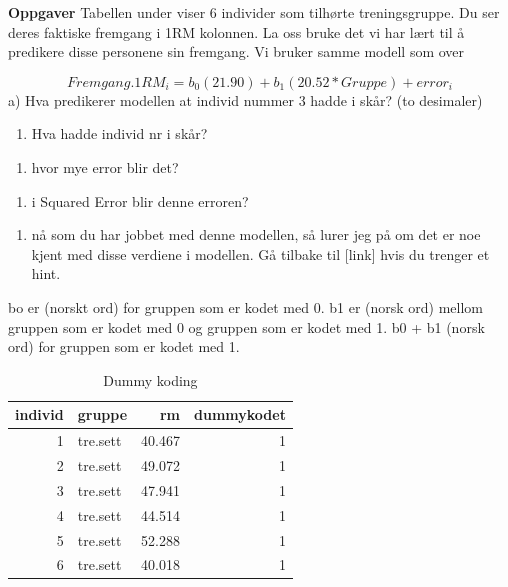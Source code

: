 \documentclass[
]{book}
\providecommand{\tightlist}{%
  \setlength{\itemsep}{0pt}\setlength{\parskip}{0pt}}
\begin{document}
\textbf{Oppgaver}
Tabellen under viser 6 individer som tilhørte treningsgruppe. Du ser deres faktiske fremgang i 1RM kolonnen. La oss bruke det vi har lært til å predikere disse personene sin fremgang. Vi bruker samme modell som over

\[
Fremgang.1RM_i = b_0(21.90) + b_1(20.52*Gruppe) + error_i
\]
a) Hva predikerer modellen at individ nummer 3 hadde i skår? (to desimaler)

\begin{enumerate}
\def\labelenumi{\alph{enumi})}
\setcounter{enumi}{1}
\tightlist
\item
  Hva hadde individ nr i skår?
\end{enumerate}

\begin{enumerate}
\def\labelenumi{\alph{enumi})}
\setcounter{enumi}{2}
\tightlist
\item
  hvor mye error blir det?
\end{enumerate}

\begin{enumerate}
\def\labelenumi{\alph{enumi})}
\setcounter{enumi}{3}
\tightlist
\item
  i Squared Error blir denne erroren?
\end{enumerate}

\begin{enumerate}
\def\labelenumi{\alph{enumi})}
\setcounter{enumi}{4}
\tightlist
\item
  nå som du har jobbet med denne modellen, så lurer jeg på om det er noe kjent med disse verdiene i modellen. Gå tilbake til {[}link{]} hvis du trenger et hint.
\end{enumerate}

bo er (norskt ord) for gruppen som er kodet med 0. b1 er (norsk ord) mellom gruppen som er kodet med 0 og gruppen som er kodet med 1. b0 + b1 (norsk ord) for gruppen som er kodet med 1.

\begin{table}

\caption{\label{tab:unnamed-chunk-11}Dummy koding}
\centering
\begin{tabular}[t]{r|l|r|r}
\hline
individ & gruppe & rm & dummykodet\\
\hline
1 & tre.sett & 40.467 & 1\\
\hline
2 & tre.sett & 49.072 & 1\\
\hline
3 & tre.sett & 47.941 & 1\\
\hline
4 & tre.sett & 44.514 & 1\\
\hline
5 & tre.sett & 52.288 & 1\\
\hline
6 & tre.sett & 40.018 & 1\\
\hline
\end{tabular}
\end{table}
\end{document}
